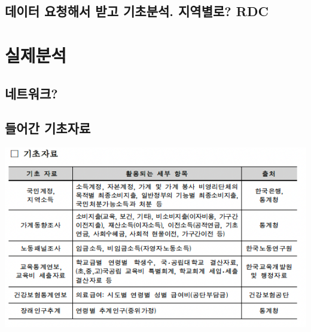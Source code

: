 \documentclass[11pt, a4paper]{article}
\begin{document}
\subsection{데이터 요청해서 받고 기초분석. 지역별로? RDC}

\section{실제분석}
\subsection{네트워크?}
\subsection{들어간 기초자료}
\includegraphics[]{basic_material_list.png}



\printbibliography
\end{document}
